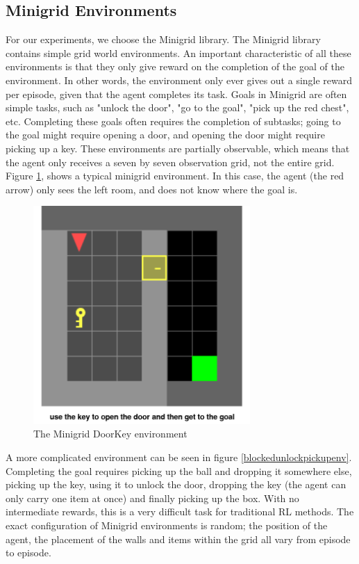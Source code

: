 \documentclass[conference]{IEEEtran}
\begin{document}
\subsection{Minigrid Environments}

For our experiments, we choose the Minigrid library. The Minigrid library contains simple grid world environments. An important characteristic of all these environments is that they only give reward on the completion of the goal of the environment. In other words, the environment only ever gives out a single reward per episode, given that the agent completes its task. Goals in Minigrid are often simple tasks, such as "unlock the door", "go to the goal", "pick up the red chest", etc. Completing these goals often requires the completion of subtasks; going to the goal might require opening a door, and opening the door might require picking up a key. These environments are partially observable, which means that the agent only receives a seven by seven observation grid, not the entire grid. Figure \ref{doorkeyenv}, shows a typical minigrid environment. In this case, the agent (the red arrow) only sees the left room, and does not know where the goal is.

\begin{figure}[h]
\centerline{\includegraphics[width=3.25in]{figure/doorkeyenv.png}}
\caption{The Minigrid DoorKey environment}
\label{doorkeyenv}
\end{figure}

A more complicated environment can be seen in figure \ref{blockedunlockpickupenv}. Completing the goal requires picking up the ball and dropping it somewhere else, picking up the key, using it to unlock the door, dropping the key (the agent can only carry one item at once) and finally picking up the box. With no intermediate rewards, this is a very difficult task for traditional RL methods. The exact configuration of Minigrid environments is random; the position of the agent, the placement of the walls and items within the grid all vary from episode to episode.
\end{document}
